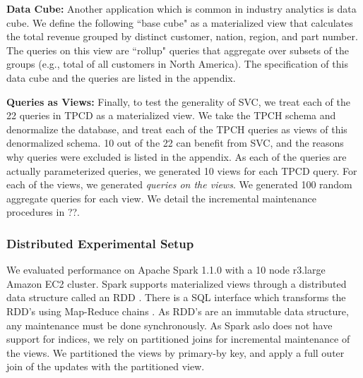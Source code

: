 \textbf{Data Cube: }  Another application which is common in industry analytics is data cube.
We define the following ``base cube" as a materialized view that calculates the total revenue 
grouped by distinct customer, nation, region, and part number.
The queries on this view are ``rollup" queries that aggregate over 
subsets of the groups (e.g., total of all customers in North America).
The specification of this data cube and the queries are listed in the appendix. 

\textbf{Queries as Views: } Finally, to test the generality of SVC, we treat each of the 22 queries in TPCD as a materialized view.
We take the TPCH schema and denormalize the database, and treat each of the TPCH queries as views of this denormalized schema. 
10 out of the 22 can benefit from SVC, and the reasons why queries were excluded is listed in the appendix.
As each of the queries are actually parameterized queries, we generated 10 views for each TPCD query.
For each of the views, we generated \emph{queries on the views}.
We generated 100 random aggregate queries for each view.
We detail the incremental maintenance procedures in ??. 

\subsubsection{Distributed Experimental Setup} 
We evaluated performance on Apache Spark 1.1.0 with a 10 node r3.large Amazon EC2 cluster.
Spark supports materialized views through a distributed data structure called an RDD \cite{zaharia2012resilient}.
There is a SQL interface which transforms the RDD's using Map-Reduce chains .
As RDD's are an immutable data structure, any maintenance must be done synchronously.
As Spark aslo does not have support for indices, we rely on partitioned joins for incremental maintenance of the views.
We partitioned the views by primary-by key, and apply a full outer join of the updates with the partitioned view.

